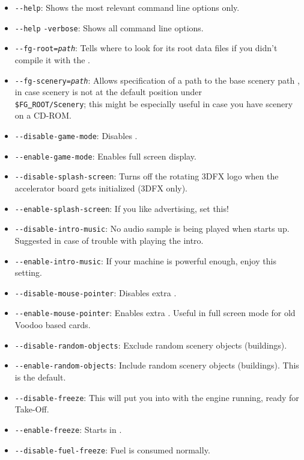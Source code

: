\begin{itemize}
\item{\texttt{-$ $-help}}: Shows the most relevant command line options only.
\item{\texttt{-$ $-help} \texttt{-verbose}}: Shows all command line options.
\item{\texttt{-$ $-fg-root={\it path}}}: Tells \FlightGear{} where to look for its root data
  files if you didn't compile it with the .
\item{\texttt{-$ $-fg-scenery={\it path}}}: Allows specification of a path to the base scenery path , in case scenery is not at the default position under\\
 \texttt{\$FG\underline{~}ROOT/Scenery}; this might be especially useful in case you
have scenery on a CD-ROM.
\item{\texttt{-$ $-disable-game-mode}}: Disables .
\item{\texttt{-$ $-enable-game-mode}}: Enables full screen display.
\item{\texttt{-$ $-disable-splash-screen}}: Turns off the rotating 3DFX logo
 when the accelerator board gets initialized (3DFX only).
\item{\texttt{-$ $-enable-splash-screen}}: If you like advertising, set this!
\item{\texttt{-$ $-disable-intro-music}}: No audio sample is being played when
  \FlightGear{} starts up. Suggested in case of trouble with playing the intro.
\item{\texttt{-$ $-enable-intro-music}}: If your machine is powerful enough, enjoy
  this setting.
\item{\texttt{-$ $-disable-mouse-pointer}}: Disables extra .
\item{\texttt{-$ $-enable-mouse-pointer}}: Enables extra . Useful in
full screen mode for old Voodoo based cards.
\item{\texttt{-$ $-disable-random-objects}}: Exclude random scenery objects (buildings).
\item{\texttt{-$ $-enable-random-objects}}: Include random scenery objects (buildings). This is the default.
\item{\texttt{-$ $-disable-freeze}}: This will put you into \FlightGear{} with the
  engine running, ready for Take-Off.
\item{\texttt{-$ $-enable-freeze}}: Starts \FlightGear{} in .
\item{\texttt{-$ $-disable-fuel-freeze}}: Fuel is consumed normally.

\end{itemize}
